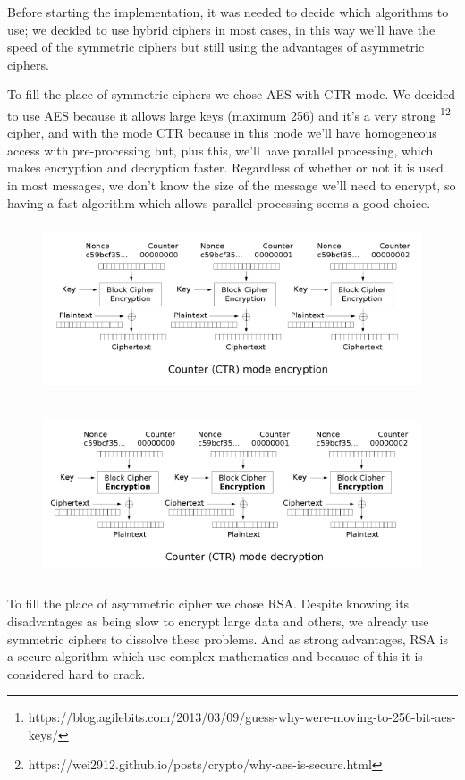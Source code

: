 \documentclass[pdftex,12pt,a4paper]{report}
\begin{document}
Before starting the implementation, it was needed to decide which algorithms to use; we decided to use hybrid ciphers in most cases, in this way we'll have the speed of the symmetric ciphers but still using the advantages of asymmetric ciphers.

To fill the place of symmetric ciphers we chose AES with CTR mode.
We decided to use AES because it allows large keys (maximum 256) and it's a very strong \footnote{https://blog.agilebits.com/2013/03/09/guess-why-were-moving-to-256-bit-aes-keys/}\footnote{https://wei2912.github.io/posts/crypto/why-aes-is-secure.html} cipher, and with the mode CTR because in this mode we'll have homogeneous access with pre-processing but, plus this, we'll have parallel processing, which makes encryption and decryption faster. Regardless of whether or not it is used in most messages, we don't know the size of the message we'll need to encrypt, so having a fast algorithm which allows parallel processing seems a good choice. 


\begin{figure}[!htb]
\center
\includegraphics[height=5cm]{imagens/Ctr_encryption.png}
\end{figure}

\begin{figure}[!htb]
\center
\includegraphics[height=5cm]{imagens/Ctr_decryption.png}
\end{figure}

To fill the place of asymmetric cipher we chose RSA. Despite knowing its disadvantages as being slow to encrypt large data and others, we already use symmetric ciphers to dissolve these problems. And as strong advantages, RSA is a secure algorithm which use complex mathematics and because of this it is considered hard to crack.
\end{document}
